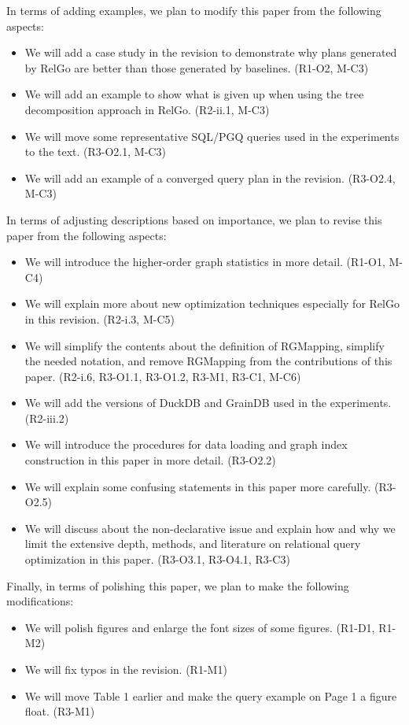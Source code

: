 In terms of adding examples, we plan to modify this paper from the following aspects:
\begin{itemize}
    \item We will add a case study in the revision to demonstrate why plans generated by RelGo are better than those generated by baselines. (R1-O2, M-C3)
    \item We will add an example to show what is given up when using the tree decomposition approach in RelGo. (R2-ii.1, M-C3)
    \item We will move some representative SQL/PGQ queries used in the experiments to the text. (R3-O2.1, M-C3)
    \item We will add an example of a converged query plan in the revision. (R3-O2.4, M-C3)
\end{itemize}

In terms of adjusting descriptions based on importance, we plan to revise this paper from the following aspects:
\begin{itemize}
    \item We will introduce the higher-order graph statistics in more detail. (R1-O1, M-C4)
    \item We will explain more about new optimization techniques especially for RelGo in this revision. (R2-i.3, M-C5)
    \item We will simplify the contents about the definition of RGMapping, simplify the needed notation, and remove RGMapping from the contributions of this paper. (R2-i.6, R3-O1.1, R3-O1.2, R3-M1, R3-C1, M-C6)
    \item We will add the versions of DuckDB and GrainDB used in the experiments. (R2-iii.2)
    \item We will introduce the procedures for data loading and graph index construction in this paper in more detail. (R3-O2.2)
    \item We will explain some confusing statements in this paper more carefully. (R3-O2.5)
    \item We will discuss about the non-declarative issue and explain how and why we limit the extensive depth, methods, and literature on relational query optimization in this paper. (R3-O3.1, R3-O4.1, R3-C3)
\end{itemize}

Finally, in terms of polishing this paper, we plan to make the following modifications:
\begin{itemize}
    \item We will polish figures and enlarge the font sizes of some figures. (R1-D1, R1-M2)
    \item We will fix typos in the revision. (R1-M1)
    \item We will move Table 1 earlier and make the query example on Page 1 a figure float. (R3-M1)
\end{itemize}

